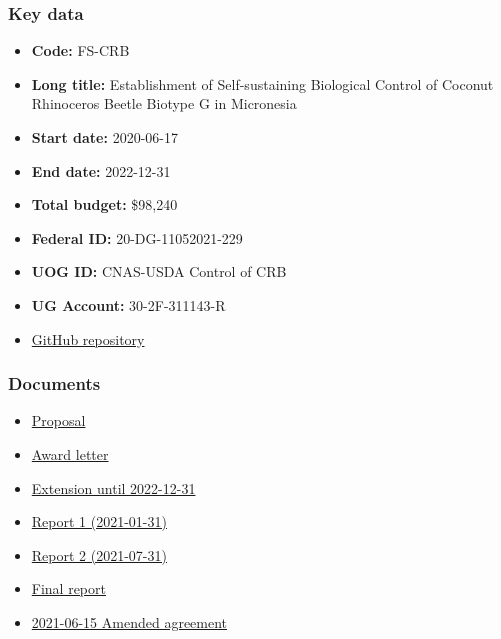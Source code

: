\subsubsection{Key data}
\begin{itemize}
	\setlength\itemsep{0em}	
	\item \textbf{Code:} FS-CRB
	\item \textbf{Long title:} Establishment of Self-sustaining Biological Control of Coconut Rhinoceros Beetle Biotype G in Micronesia
	\item \textbf{Start date:} 2020-06-17
	\item \textbf{End date:} 2022-12-31
	\item \textbf{Total budget:} \$98,240
	\item \textbf{Federal ID:} 20-DG-11052021-229
	\item \textbf{UOG ID:} CNAS-USDA Control of CRB
	\item \textbf{UG Account:} 30-2F-311143-R
	\item \href{https://github.com/aubreymoore/2020-FS-CRB-biocontrol-project}{GitHub repository}
\end{itemize}

\subsubsection{Documents}
\begin{itemize}
	\setlength\itemsep{0em}	
	\item \href{https://github.com/aubreymoore/2020-FS-CRB-biocontrol-project/blob/master/combined-proposal.pdf}{Proposal}
	\item \href{https://github.com/aubreymoore/grant-tracker/blob/main/mydocs/20-DG-229\%20UOG\%20LFA\%20CRB\%20Fully\%20Signed\%20Grant.pdf}{Award letter}
	\item \href{https://github.com/aubreymoore/grant-tracker/blob/main/mydocs/20-DG-229\%20UOG\%20Mod\%201\%20Fully\%20Signed.pdf}{Extension until 2022-12-31}
	\item \href{https://github.com/aubreymoore/2020-FS-CRB-biocontrol-project/raw/master/FS-CRB-biocontrol-report1.pdf}{Report 1 (2021-01-31)}
	\item \href{}{Report 2 (2021-07-31)}
	\item \href{}{Final report}
	\item \href{https://github.com/aubreymoore/2020-FS-CRB-biocontrol-project/blob/master/20-DG-229-UOG-Mod-2-Fully-Signed.pdf}{2021-06-15 Amended agreement}
\end{itemize}





